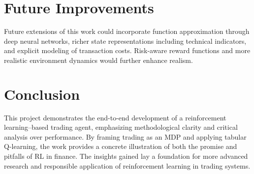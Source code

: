\documentclass[12pt]{report}
\begin{document}
\chapter{Future Improvements}

Future extensions of this work could incorporate function approximation through deep neural networks, richer state representations including technical indicators, and explicit modeling of transaction costs. Risk-aware reward functions and more realistic environment dynamics would further enhance realism.

\chapter{Conclusion}

This project demonstrates the end-to-end development of a reinforcement learning–based trading agent, emphasizing methodological clarity and critical analysis over performance. By framing trading as an MDP and applying tabular Q-learning, the work provides a concrete illustration of both the promise and pitfalls of RL in finance. The insights gained lay a foundation for more advanced research and responsible application of reinforcement learning in trading systems.
\end{document}
